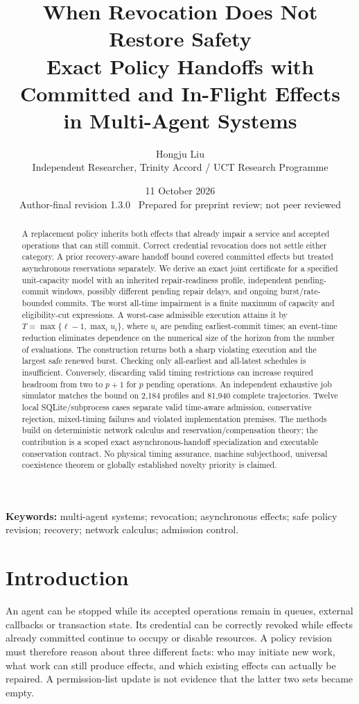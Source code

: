 \documentclass[11pt,a4paper]{article}
\title{\vspace{-1cm}\textbf{When Revocation Does Not Restore Safety}\\[6pt]
\Large Exact Policy Handoffs with Committed and In-Flight Effects\\in Multi-Agent Systems}
\author{Hongju Liu\\\normalsize Independent Researcher, Trinity Accord / UCT Research Programme}
\date{11 October 2026\\\small Author-final revision 1.3.0 \textbullet\ Prepared for preprint review; not peer reviewed}
\theoremstyle{definition}\newtheorem{definition}{Definition}
\begin{document}
\maketitle\thispagestyle{plain}
\begin{abstract}
A replacement policy inherits both effects that already impair a service and accepted operations that can still commit. Correct credential revocation does not settle either category. A prior recovery-aware handoff bound covered committed effects but treated asynchronous reservations separately. We derive an exact joint certificate for a specified unit-capacity model with an inherited repair-readiness profile, independent pending-commit windows, possibly different pending repair delays, and ongoing burst/rate-bounded commits. The worst all-time impairment is a finite maximum of capacity and eligibility-cut expressions. A worst-case admissible execution attains it by $T=\max\{\ell-1,\max_i u_i\}$, where $u_i$ are pending earliest-commit times; an event-time reduction eliminates dependence on the numerical size of the horizon from the number of evaluations. The construction returns both a sharp violating execution and the largest safe renewed burst. Checking only all-earliest and all-latest schedules is insufficient. Conversely, discarding valid timing restrictions can increase required headroom from two to $p+1$ for $p$ pending operations. An independent exhaustive job simulator matches the bound on 2,184 profiles and 81,940 complete trajectories. Twelve local SQLite/subprocess cases separate valid time-aware admission, conservative rejection, mixed-timing failures and violated implementation premises. The methods build on deterministic network calculus and reservation/compensation theory; the contribution is a scoped exact asynchronous-handoff specialization and executable conservation contract. No physical timing assurance, machine subjecthood, universal coexistence theorem or globally established novelty priority is claimed.
\end{abstract}
\noindent\textbf{Keywords:} multi-agent systems; revocation; asynchronous effects; safe policy revision; recovery; network calculus; admission control.

\section{Introduction}
An agent can be stopped while its accepted operations remain in queues, external callbacks or transaction state. Its credential can be correctly revoked while effects already committed continue to occupy or disable resources. A policy revision must therefore reason about three different facts: who may initiate new work, what work can still produce effects, and which existing effects can actually be repaired. A permission-list update is not evidence that the latter two sets became empty.
\end{document}

